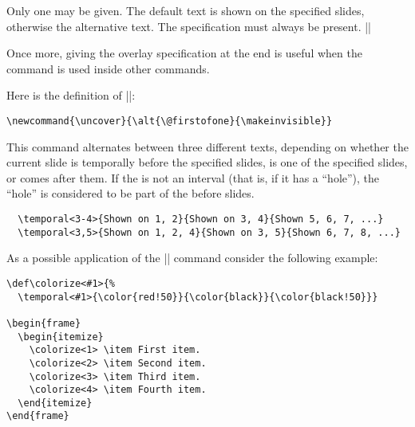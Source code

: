 \begin{command}{\alt{}%
    }
  Only one  may be given.
  The default text is shown on the specified slides, otherwise the
  alternative text. The specification must always be present.
  \example ||

  Once more, giving the overlay specification at the end is useful
  when the command is used inside other commands.

  \example Here is the definition of |\uncover|:
\begin{verbatim}
\newcommand{\uncover}{\alt{\@firstofone}{\makeinvisible}}
\end{verbatim}
\end{command}

\begin{command}{\temporal{}%
    }
  This command alternates between three different texts, depending on
  whether the current slide is temporally before the specified
  slides, is one of the specified slides, or comes after them. If the
   is not an interval (that is, if it has
  a ``hole''), the ``hole'' is considered to be part of the before slides.
  \example
\begin{verbatim}
  \temporal<3-4>{Shown on 1, 2}{Shown on 3, 4}{Shown 5, 6, 7, ...}
  \temporal<3,5>{Shown on 1, 2, 4}{Shown on 3, 5}{Shown 6, 7, 8, ...}
\end{verbatim}

  As a possible application of the |\temporal| command consider the
  following example:
  \example
\begin{verbatim}
\def\colorize<#1>{%
  \temporal<#1>{\color{red!50}}{\color{black}}{\color{black!50}}}

\begin{frame}
  \begin{itemize}
    \colorize<1> \item First item.
    \colorize<2> \item Second item.
    \colorize<3> \item Third item.
    \colorize<4> \item Fourth item.
  \end{itemize}
\end{frame}
\end{verbatim}
\end{command}


